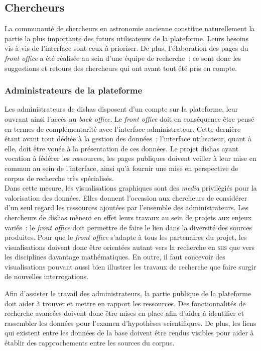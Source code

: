 \documentclass[a4paper,12pt,twoside]{book}
\newcommand{\eng}{\emph}
\newcommand{\dishas}{\gls{dishas}\xspace}
\begin{document}
		\subsection{Chercheurs}
La communauté de chercheurs en astronomie ancienne constitue naturellement la partie la plus importante des futurs utilisateurs de la plateforme. Leurs besoins vis-à-vis de l'interface sont ceux à prioriser. De plus, l'élaboration des pages du \eng{front office} a été réalisée au sein d'une équipe de recherche~: ce sont donc les suggestions et retours des chercheurs qui ont avant tout été pris en compte.

			\subsubsection{Administrateurs de la plateforme}
Les administrateurs de \dishas disposent d'un compte sur la plateforme, leur ouvrant ainsi l'accès au \eng{back office}. Le \eng{front office} doit en conséquence être pensé en termes de complémentarité avec l'interface administrateur. Cette dernière étant avant tout dédiée à la gestion des données~; l'interface utilisateur, quant à elle, doit être vouée à la présentation de ces données. Le projet \dishas ayant vocation à fédérer les ressources, les pages publiques doivent veiller à leur mise en commun au sein de l'interface, ainsi qu'à fournir une mise en perspective de corpus de recherche très spécialisés.\\

Dans cette mesure, les visualisations graphiques sont des \emph{media} privilégiés pour la valorisation des données. Elles donnent l'occasion aux chercheurs de considérer d'un seul regard les ressources ajoutées par l'ensemble des administrateurs. Les chercheurs de \dishas mènent en effet leurs travaux au sein de projets aux enjeux variés~: le \eng{front office} doit permettre de faire le lien dans la diversité des sources produites. Pour que le \eng{front office} s'adapte à tous les partenaires du projet, les visualisations doivent donc être orientées autant vers la recherche en \textsc{shs} que vers les disciplines davantage mathématiques. En outre, il faut concevoir des visualisations pouvant aussi bien illustrer les travaux de recherche que faire surgir de nouvelles interrogations. 

Afin d'assister le travail des administrateurs, la partie publique de la plateforme doit aider à trouver et mettre en rapport les ressources. Des fonctionnalités de recherche avancées doivent donc être mises en place afin d'aider à identifier et rassembler les données pour l'examen d'hypothèses scientifiques. De plus, les liens qui existent entre les données de la base doivent être rendus visibles pour aider à établir des rapprochements entre les sources du corpus.
\end{document}

